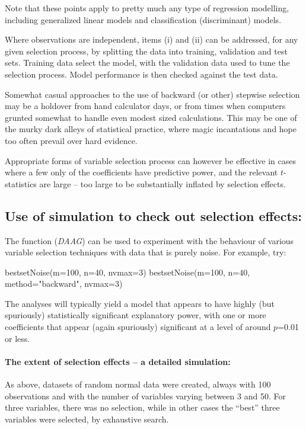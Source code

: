 Note that these points apply to pretty much any type of regression
modelling, including generalized linear models and classification
(discriminant) models.

Where observations are independent, items (i) and (ii) can be
addressed, for any given selection process, by splitting the data into
training, validation and test sets.  Training data select the model,
with the validation data used to tune the selection process.
Model performance is then checked against the test data.

Somewhat casual approaches to the use of backward (or other) stepwise
selection may be a holdover from hand calculator days, or from times
when computers grunted somewhat to handle even modest sized
calculations.  This may be one of the murky dark alleys of statistical
practice, where magic incantations and hope too often prevail over
hard evidence.

Appropriate forms of variable selection process can however be
effective in cases where a few only of the coefficients have
predictive power, and the relevant $t$-statistics are large --
too large to be substantially inflated by selection effects.

\subsection{Use of simulation to check out selection effects:}
The function  ({\em DAAG}) can be used to
experiment with the behaviour of various variable selection techniques
with data that is purely noise.  For example, try:
\begin{Schunk}
\begin{Sinput}
bestsetNoise(m=100, n=40, nvmax=3)
bestsetNoise(m=100, n=40, method="backward",
             nvmax=3)
\end{Sinput}
\end{Schunk}
The analyses will typically yield a model that appears to
have highly (but spuriously) statistically significant explanatory power,
with one or more coefficients that appear (again spuriously)
significant at a level of around $p$=0.01 or less.

\paragraph{The extent of selection effects -- a detailed simulation:}
As above, datasets of random normal data were created, always with 100
observations and with the number of variables varying between 3 and
50.  For three variables, there was no selection, while in other cases
the ``best'' three variables were selected, by exhaustive search.

